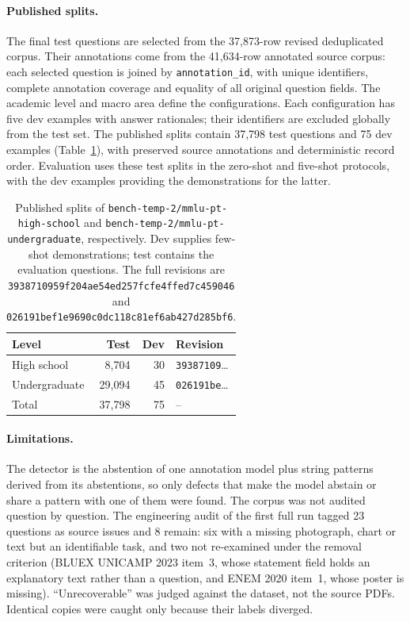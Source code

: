 \paragraph{Published splits.} The final test questions are selected from
the 37,873-row revised deduplicated corpus. Their annotations come from the
41,634-row annotated source corpus: each selected question is joined by
\texttt{annotation\_id}, with unique identifiers, complete annotation
coverage and equality of all original question fields. The academic level
and macro area define the configurations. Each configuration has five dev
examples with answer rationales; their identifiers are excluded globally
from the test set. The published splits contain 37,798 test questions and 
75 dev examples (Table~\ref{tab:rev-short-splits}), with preserved source
annotations and deterministic record order. Evaluation uses these test
splits in the zero-shot and five-shot protocols, with the dev examples
providing the demonstrations for the latter.

\begin{table}[t]
\centering
\footnotesize
\begin{tabular}{@{}lrrl@{}}
\toprule
Level & Test & Dev & Revision \\
\midrule
High school & 8,704 & 30 & \texttt{39387109}\ldots \\
Undergraduate & 29,094 & 45 & \texttt{026191be}\ldots \\
\midrule
Total & 37,798 & 75 & -- \\
\bottomrule
\end{tabular}
\caption{Published splits of \texttt{bench-temp-2/mmlu-pt-high-school} and
\texttt{bench-temp-2/mmlu-pt-undergraduate}, respectively. Dev supplies
few-shot demonstrations; test contains the evaluation questions.
The full revisions are
\texttt{3938710959f204ae54ed}\allowbreak\texttt{257fcfe4ffed7c459046} and
\texttt{026191bef1e9690c0dc1}\allowbreak\texttt{18c81ef6ab427d285bf6}.}
\label{tab:rev-short-splits}
\end{table}

\paragraph{Limitations.} The detector is the abstention of one annotation
model plus string patterns derived from its abstentions, so only defects that
make the model abstain or share a pattern with one of them were found. The
corpus was not audited question by question. The engineering audit of the
first full run tagged 23 questions as source issues and 8 remain: six with a
missing photograph, chart or text but an identifiable task, and two not
re-examined under the removal criterion (BLUEX UNICAMP 2023 item~3, whose
statement field holds an explanatory text rather than a question, and ENEM
2020 item~1, whose poster is missing). ``Unrecoverable'' was judged against
the dataset, not the source PDFs. Identical copies were caught only because
their labels diverged.
